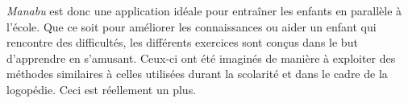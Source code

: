 \textit{Manabu} est donc une application idéale pour entraîner les enfants en parallèle à l'école. Que ce soit pour améliorer les connaissances ou aider un enfant qui rencontre des difficultés, les différents exercices sont conçus dans le but d'apprendre en s'amusant. Ceux-ci ont été imaginés de manière à exploiter des méthodes similaires à celles utilisées durant la scolarité et dans le cadre de la logopédie. Ceci est réellement un plus.



